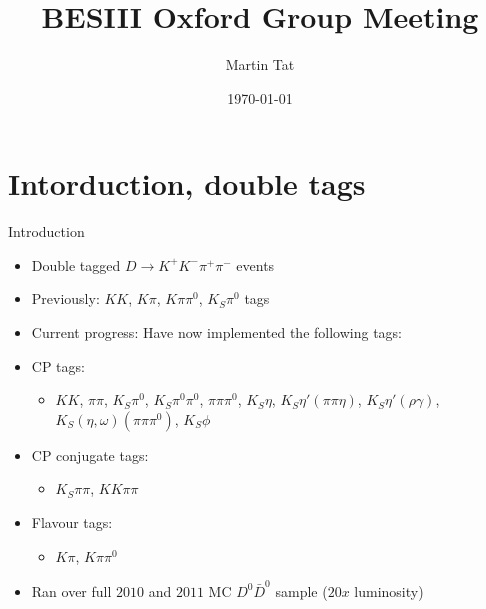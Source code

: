 \documentclass{beamer}
\title[BESIII Oxford]{BESIII Oxford Group Meeting}
\author{Martin Tat}
\institute{Oxford LHCb}
\date{\today}
\begin{document}
\begin{frame}
  \titlepage
\end{frame}


\section{Intorduction, double tags}
\begin{frame}{Introduction}
  \begin{itemize}
    \item{Double tagged $D\to K^+K^-\pi^+\pi^-$ events}
    \item{Previously: $KK$, $K\pi$, $K\pi\pi^0$, $K_S\pi^0$ tags}
    \item{Current progress: Have now implemented the following tags:}
    \item{CP tags:}
    \begin{itemize}
      \item{$KK$, $\pi\pi$, $K_S\pi^0$, $K_S\pi^0\pi^0$, $\pi\pi\pi^0$, $K_S\eta$, $K_S\eta'(\pi\pi\eta)$, $K_S\eta'(\rho\gamma)$, $K_S(\eta, \omega)(\pi\pi\pi^0)$, $K_S\phi$}
    \end{itemize}
    \item{CP conjugate tags:}
    \begin{itemize}
      \item{$K_S\pi\pi$, $KK\pi\pi$}
    \end{itemize}
    \item{Flavour tags:}
    \begin{itemize}
      \item{$K\pi$, $K\pi\pi^0$}
    \end{itemize}
    \item{Ran over full $2010$ and $2011$ MC $D^0\bar{D}^0$ sample ($20x$ luminosity)}
  \end{itemize}
\end{frame}
\end{document}
